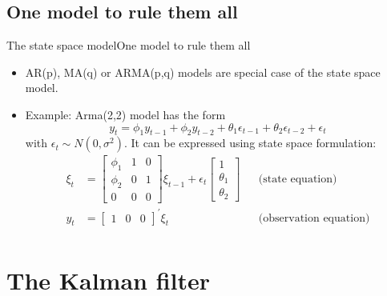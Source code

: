 \documentclass[10pt]{beamer}
\begin{document}
\subsection{One model to rule them all}
%
%
\begin{frame}{The state space model}{One model to rule them all}
%
%
%
\begin{itemize}
%
\item AR(p), MA(q) or ARMA(p,q) models are special case of the state space model.
%
\item Example: Arma(2,2) model has the form
%
\begin{equation*}
y_{t} = \phi_{1}y_{t-1}+\phi_{2}y_{t-2}+\theta_{1}\epsilon_{t-1}+\theta_{2}\epsilon_{t-2} + \epsilon_{t}
\end{equation*}
%
with $\epsilon_{t}\sim N(0,\sigma^{2})$. It can be expressed using state space formulation:
%
\begin{align*}
    \xi_{t} &=
\left[
\begin{array}{ccc}
\phi_{1} & 1 & 0 \\
\phi_{2} & 0 & 1 \\
0 & 0 & 0 
\end{array}
\right]\xi_{t-1} + \epsilon_{t}%
\left[
\begin{array}{c}
1\\
\theta_{1}\\
\theta_{2}
\end{array}
\right]
%
&& \text{(state equation)}\\
    y_{t} &= \left[
\begin{array}{ccc}
1 & 0 & 0
\end{array}
\right]^{'}
\xi_{t} && \text{(observation equation)}\\
\end{align*}
%
\end{itemize}
%
\end{frame}
%
\section{The Kalman filter}
%
\end{document}
